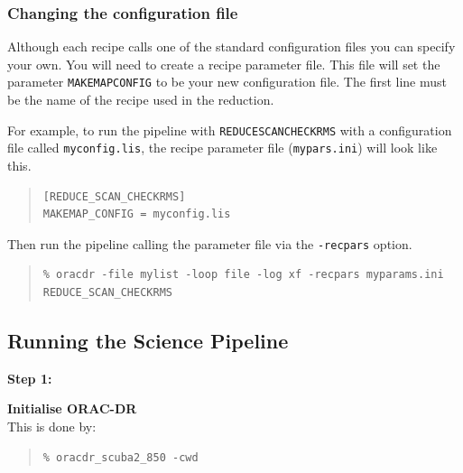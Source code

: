 \documentclass[twoside,11pt]{article}
\newcommand{\xlabel}[1]{}
\renewcommand{\_}{\texttt{\symbol{95}}}
\newenvironment{myquote}{
   \color{MidnightBlue}\begin{quote}\begin{small}}{
   \end{small}\end{quote}
}
\newcommand{\drrecipe}[1]{\texttt{#1}}
\newcommand{\param}[1]{\texttt{#1}}
\newcommand{\file}[1]{\texttt{#1}}
\renewenvironment{myquote}{
      \begin{quote}\begin{small}}{
      \end{small}\end{quote}
   }
\begin{document}
\subsubsection{Changing the configuration file}

Although each recipe calls one of the standard configuration files
you can specify your own. You will need to create a recipe parameter
file. This file will set the parameter \param{MAKEMAP\_CONFIG} to be
your new configuration file. The first line must be the name of the
recipe used in the reduction.

For example, to run the pipeline with \drrecipe{REDUCE\_SCAN\_CHECKRMS} with a
configuration file called \file{myconfig.lis}, the recipe parameter file
(\file{mypars.ini}) will look like this.
\vspace{0.2cm}
\begin{quote}
\begin{verbatim}
[REDUCE_SCAN_CHECKRMS]
MAKEMAP_CONFIG = myconfig.lis
\end{verbatim}
\end{quote}

Then run the pipeline calling the parameter file via the
\texttt{-recpars} option.
\begin{myquote}
\begin{verbatim}
% oracdr -file mylist -loop file -log xf -recpars myparams.ini REDUCE_SCAN_CHECKRMS
\end{verbatim}
\end{myquote}


\subsection{\xlabel{running_pl}Running the Science Pipeline}
\label{sec:plsteps}

\begin{minipage}[t]{0.12\linewidth}
\textbf{Step 1:}
\end{minipage}
\begin{minipage}[t]{0.87\linewidth}
\textbf{Initialise ORAC-DR} \\This is done by:
\begin{myquote}
\begin{verbatim}
% oracdr_scuba2_850 -cwd
\end{verbatim}
\end{myquote}
\end{minipage}
\end{document}
